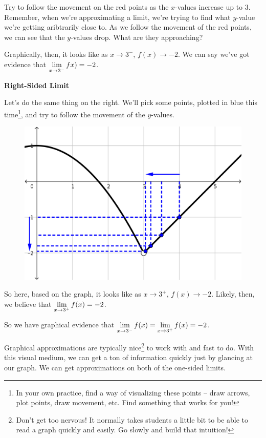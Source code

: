 Try to follow the movement on the red points as the $x$-values increase up to $3$.
Remember, when we're approximating a limit, we're trying to find what $y$-value we're getting aribtrarily close to.
As we follow the movement of the red points, we can see that the $y$-values drop.
What are they approaching?

Graphically, then, it looks like as $x\to 3^-$, $f(x) \to -2$.
We can say we've got evidence that $\displaystyle \lim_{x\to 3^-} fx) = -2$.

\textbf{Right-Sided Limit}

Let's do the same thing on the right.
We'll pick some points, plotted in blue this time\footnote{In your own practice, find a way of visualizing these points -- draw arrows, plot points, draw movement, etc. Find something that works for you!}, and try to follow the movement of the $y$-values.

\begin{figure}[h!tb]
  \includegraphics[scale=0.75]{./1_limits/images/1-1_graph1R.png}
  \centering
\end{figure}

So here, based on the graph, it looks like as $x\to 3^+$, $f(x)\to -2$.
Likely, then, we believe that $\displaystyle \lim_{x\to 3^+} f(x) = -2$.

So we have graphical evidence that $\displaystyle \lim_{x\to 3^-} f(x) = \displaystyle \lim_{x\to 3^+} f(x) = -2$.

Graphical approximations are typically nice\footnote{Don't get too nervous! It normally takes students a little bit to be able to read a graph quickly and easily. Go slowly and build that intuition!} to work with and fast to do.
With this visual medium, we can get a ton of information quickly just by glancing at our graph.
We can get approximations on both of the one-sided limits.

